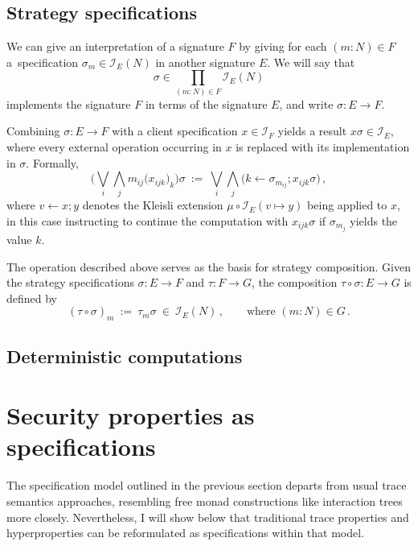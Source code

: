 \documentclass[11pt]{article}
\begin{document}

\subsection{Strategy specifications} %

We can give an interpretation of a signature $F$
by giving for each $(m \mathbin: N) \in F$
a~specification $\sigma_m \in \mathcal{I}_E(N)$
in another signature $E$.
We will say that
\[
  \sigma \in \prod_{(m \mathbin: N) \in F} \mathcal{I}_{E}(N)
\]
implements the signature $F$ in terms of the signature $E$,
and write $\sigma : E \rightarrow F$.

Combining $\sigma : E \rightarrow F$ with
a client specification $x \in \mathcal{I}_F$
yields a result $x\sigma \in \mathcal{I}_E$,
where every external operation occurring in $x$
is replaced with its implementation in $\sigma$.
Formally,
\[
  \Big( \bigvee_i \bigwedge_j m_{ij}\big(x_{ijk}\big)_k \Big) \sigma
  \::=\:
  \bigvee_i \bigwedge_j
    \big(k \mathbin\leftarrow \sigma_{m_{ij}} \mathbin; x_{ijk} \sigma \big)
  \,,
\]
where $v \mathbin\leftarrow x \mathbin; y$
denotes the Kleisli extension
$\mu \circ \mathcal{I}_E(v \mapsto y)$
being applied to $x$,
in this case instructing to continue the computation with $x_{ijk} \sigma$
if $\sigma_{m_j}$ yields the value $k$.

The operation described above serves as the basis for strategy composition.
Given the strategy specifications
$\sigma : E \rightarrow F$ and $\tau : F \rightarrow G$,
the composition $\tau \circ \sigma : E \rightarrow G$ is defined by
\[
  (\tau \circ \sigma)_m \: := \: \tau_m \sigma \: \in \: \mathcal{I}_E(N)
  \,,
  \qquad \text{where }
  (m \mathbin: N) \in G
  \,.
\]


\subsection{Deterministic computations}


\section{Security properties as specifications} %

The specification model outlined in the previous section
departs from usual trace semantics approaches,
resembling free monad constructions like interaction trees more closely.
Nevertheless,
I will show below that
traditional trace properties and hyperproperties
can be reformulated as specifications within that model.
\end{document}
